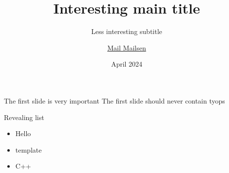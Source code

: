 \documentclass{beamer}
\title{Interesting main title}
\subtitle{Less interesting subtitle}
\author{\href{mailto:mail.mailsen@mailserver.top}{Mail Mailsen}}
\date{April 2024}
\begin{document}
\maketitle

\begin{frame}{The first slide is very important}
The first slide should never contain tyops
\end{frame}
\begin{frame}{Revealing list}
\begin{itemize}[<+->]
	\item Hello
    \item template
    \item C++
\end{itemize}
\end{frame}
\end{document}
